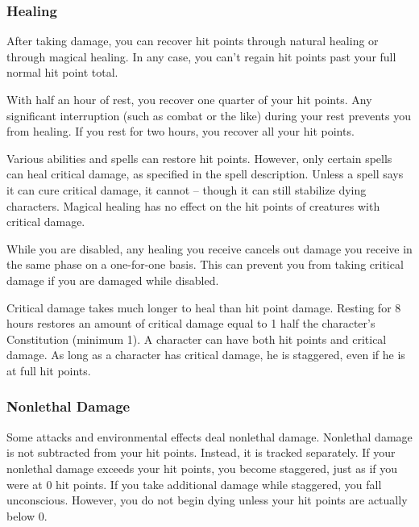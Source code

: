         \subsubsection{Healing}
            After taking damage, you can recover hit points through natural healing or through magical healing.
            In any case, you can't regain hit points past your full normal hit point total.

             With half an hour of rest, you recover one quarter of your hit points.
            Any significant interruption (such as combat or the like) during your rest prevents you from healing.
            If you rest for two hours, you recover all your hit points.

             Various abilities and spells can restore hit points.
            However, only certain spells can heal critical damage, as specified in the spell description.
            Unless a spell says it can cure critical damage, it cannot -- though it can still stabilize dying characters.
            Magical healing has no effect on the hit points of creatures with critical damage.

             While you are disabled, any healing you receive cancels out damage you receive in the same phase on a one-for-one basis.
            This can prevent you from taking critical damage if you are damaged while disabled.

             Critical damage takes much longer to heal than hit point damage.
            Resting for 8 hours restores an amount of critical damage equal to 1 \add half the character's Constitution (minimum 1).
            A character can have both hit points and critical damage.
            As long as a character has critical damage, he is staggered, even if he is at full hit points.

        \subsubsection{Nonlethal Damage}\label{Nonlethal Damage}
            Some attacks and environmental effects deal nonlethal damage.
            Nonlethal damage is not subtracted from your hit points.
            Instead, it is tracked separately.
            If your nonlethal damage exceeds your hit points, you become staggered, just as if you were at 0 hit points.
            If you take additional damage while staggered, you fall unconscious.
            However, you do not begin dying unless your hit points are actually below 0.

